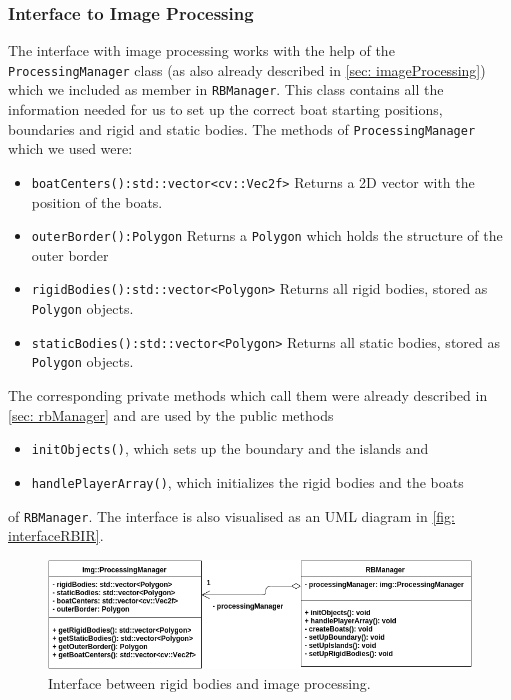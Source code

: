 \subsubsection{Interface to Image Processing}
\label{sec: interfaceImageProcessing}
The interface with image processing works with the help of the \texttt{ProcessingManager} class (as also already described in \autoref{sec: imageProcessing}) which we included as member in \texttt{RBManager}. This class contains all the information needed for us to set up the correct boat starting positions, boundaries and rigid and static bodies. The methods of \texttt{ProcessingManager} which we used were:
\begin{itemize}
\item \texttt{boatCenters():std::vector<cv::Vec2f>} Returns a 2D vector with the position of the boats.
\item \texttt{outerBorder():Polygon} Returns a \texttt{Polygon} which holds the structure of the outer border
\item \texttt{rigidBodies():std::vector<Polygon>} Returns all rigid bodies, stored as \texttt{Polygon} objects.
\item \texttt{staticBodies():std::vector<Polygon>} Returns all static bodies, stored as \texttt{Polygon} objects.
\end{itemize} 
The corresponding private methods which call them were already described in \autoref{sec: rbManager} and are used by the public methods
\begin{itemize}
\item \texttt{initObjects()}, which sets up the boundary and the islands and
\item \texttt{handlePlayerArray()}, which initializes the rigid bodies and the boats
\end{itemize}
of \texttt{RBManager}. The interface is also visualised as an UML diagram in \autoref{fig: interfaceRBIR}.
\begin{figure}[ht]
\centering
\includegraphics[scale=0.5]{img/RigidBodies/InterfaceRBImageRecogniton.png}
\caption{Interface between rigid bodies and image processing.}
\label{fig: interfaceRBIR}
\end{figure}


